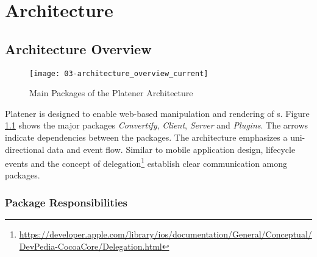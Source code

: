 \documentclass[../ClassicThesis.tex]{subfiles}
\begin{document}
\chapter{Architecture}\label{ch:architecture}

\newcommand\myNotes[1]{\textcolor{red}{#1}}

\section{Architecture Overview}

\begin{figure}
  \texttt{[image: 03-architecture\_overview\_current]}
  \caption{Main Packages of the Platener Architecture}
  \label{fig:architectureOverviewCurrent}
\end{figure}

Platener is designed to enable web-based manipulation and rendering of
{\threedmodel}s. Figure \ref{fig:architectureOverviewCurrent} shows the major
packages \emph{Convertify}, \emph{Client}, \emph{Server} and \emph{Plugins}. The
arrows indicate dependencies between the packages. The architecture emphasizes a
uni-directional data and event flow. Similar to mobile application design,
lifecycle events and the concept of
delegation\footnote{\url{https://developer.apple.com/library/ios/documentation/General/Conceptual/DevPedia-CocoaCore/Delegation.html}}
establish clear communication among packages.


\subsection{Package Responsibilities}
\end{document}
